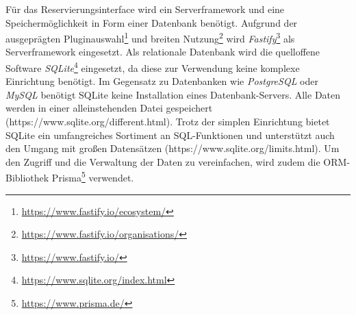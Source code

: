 Für das Reservierungsinterface wird ein Serverframework und eine
Speichermöglichkeit in Form einer Datenbank benötigt. Aufgrund der ausgeprägten
Pluginauswahl\footnote{\url{https://www.fastify.io/ecosystem/}} und breiten
Nutzung\footnote{\url{https://www.fastify.io/organisations/}} wird
\textit{Fastify}\footnote{\url{https://www.fastify.io/}} als Serverframework eingesetzt.
Als relationale Datenbank wird die quelloffene Software
\textit{SQLite}\footnote{\url{https://www.sqlite.org/index.html}} eingesetzt, da diese
zur Verwendung keine komplexe Einrichtung benötigt. Im Gegensatz zu Datenbanken
wie \textit{PostgreSQL} oder \textit{MySQL} benötigt SQLite keine Installation
eines Datenbank-Servers. Alle Daten werden in einer alleinstehenden Datei
gespeichert (https://www.sqlite.org/different.html). Trotz der simplen
Einrichtung bietet SQLite ein umfangreiches Sortiment an SQL-Funktionen und
unterstützt auch den Umgang mit großen Datensätzen
(https://www.sqlite.org/limits.html). Um den Zugriff und die Verwaltung der
Daten zu vereinfachen, wird zudem die ORM-Bibliothek
Prisma\footnote{\url{https://www.prisma.de/}} verwendet.


